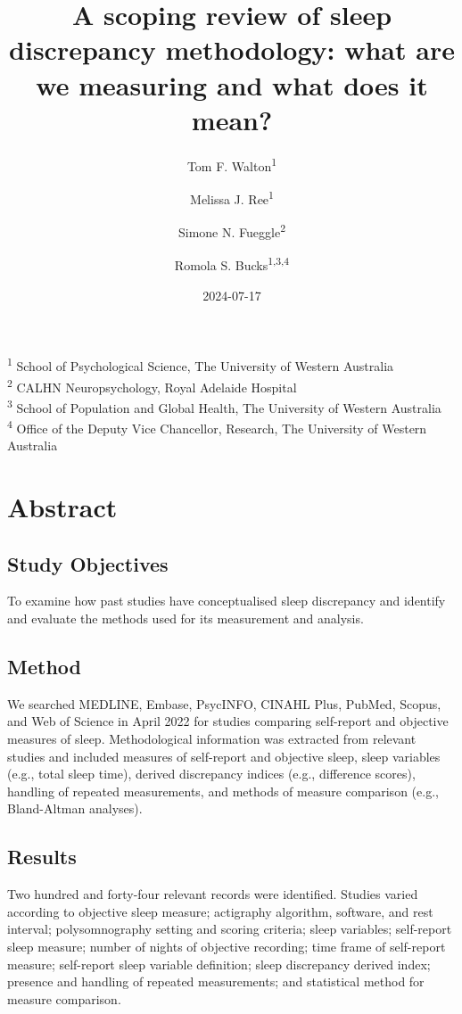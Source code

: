 \documentclass[
]{article}
\title{A scoping review of sleep discrepancy methodology: what are we measuring and what does it mean?}
\author{Tom F. Walton\textsuperscript{1} \and Melissa J. Ree\textsuperscript{1} \and Simone N. Fueggle\textsuperscript{2} \and Romola S. Bucks\textsuperscript{1,3,4}}
\date{2024-07-17}
\begin{document}
\maketitle

\textsuperscript{1} School of Psychological Science, The University of Western Australia\\
\textsuperscript{2} CALHN Neuropsychology, Royal Adelaide Hospital\\
\textsuperscript{3} School of Population and Global Health, The University of Western Australia\\
\textsuperscript{4} Office of the Deputy Vice Chancellor, Research, The University of Western Australia

\section{Abstract}\label{abstract}

\subsection{Study Objectives}\label{study-objectives}

To examine how past studies have conceptualised sleep discrepancy and identify and evaluate the methods used for its measurement and analysis.

\subsection{Method}\label{method}

We searched MEDLINE, Embase, PsycINFO, CINAHL Plus, PubMed, Scopus, and Web of Science in April 2022 for studies comparing self-report and objective measures of sleep. Methodological information was extracted from relevant studies and included measures of self-report and objective sleep, sleep variables (e.g., total sleep time), derived discrepancy indices (e.g., difference scores), handling of repeated measurements, and methods of measure comparison (e.g., Bland-Altman analyses).

\subsection{Results}\label{results}

Two hundred and forty-four relevant records were identified. Studies varied according to objective sleep measure; actigraphy algorithm, software, and rest interval; polysomnography setting and scoring criteria; sleep variables; self-report sleep measure; number of nights of objective recording; time frame of self-report measure; self-report sleep variable definition; sleep discrepancy derived index; presence and handling of repeated measurements; and statistical method for measure comparison.
\end{document}
